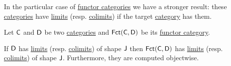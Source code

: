 \documentclass[../../main]{subfiles}
\begin{document}
In the particular case of \hyperref[def:functor-category]{functor categories} we have a stronger result: these \hyperref[def:category]{categories} have \hyperref[def:categorical-limit]{limits} (resp. \hyperref[def:categorical-colimit]{colimits}) if the target \hyperref[def:category]{category} has them.
\begin{proposition}\label{prop:limits-in-functor-category}
  Let \(\mathsf{C}\) and \(\mathsf{D}\) be two \hyperref[def:category]{categories} and \(\mathsf{Fct}(\mathsf{C}, \mathsf{D})\) be its \hyperref[def:functor-category]{functor category}.

  If \(\mathsf{D}\) has \hyperref[def:categorical-limit]{limits} (resp. \hyperref[def:categorical-colimit]{colimits}) of shape \(\mathsf{J}\) then \(\mathsf{Fct}(\mathsf{C}, \mathsf{D})\) has  \hyperref[def:categorical-limit]{limits} (resp. \hyperref[def:categorical-colimit]{colimits}) of shape \(\mathsf{J}\).
  Furthermore, they are computed objectwise.
\end{proposition}
\end{document}
